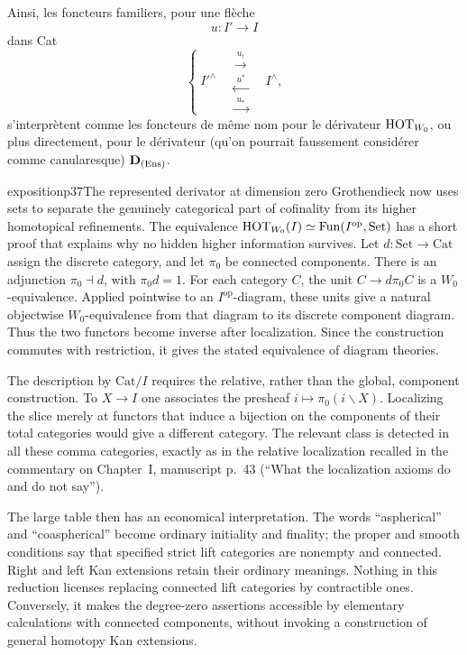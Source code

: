 Ainsi, les foncteurs familiers, pour une flèche
\[
u : I' \longrightarrow I
\]
dans Cat
\[
\left\{
\; I'^{\wedge} \quad
\begin{array}{c}
\xrightarrow{\;u_!\;} \\[1.5ex]
\xleftarrow{\;u^*\;} \\[1.5ex]
\xrightarrow{\;u_*\;}
\end{array}
\quad I^{\wedge},
\right. \tag*{(3.7)}
\]
s'interprètent comme les foncteurs de même nom pour le dérivateur $\mathrm{HOT}_{W_0}$, ou plus directement, pour le dérivateur (qu'on pourrait faussement considérer comme canularesque) $\mathbf{D}_{(\mathrm{Ens})}$.

\begin{dcomment}{exposition}{p37}{The represented derivator at dimension zero}
Grothendieck now uses sets to separate the genuinely categorical part of cofinality from its higher homotopical refinements. The equivalence $\mathrm{HOT}_{W_0}(I)\simeq\operatorname{Fun}(I^{\mathrm{op}},\mathrm{Set})$ has a short proof that explains why no hidden higher information survives. Let $d:\mathrm{Set}\longrightarrow\mathrm{Cat}$ assign the discrete category, and let $\pi_0$ be connected components. There is an adjunction $\pi_0\dashv d$, with $\pi_0d=1$. For each category $C$, the unit $C\longrightarrow d\pi_0C$ is a $W_0$-equivalence. Applied pointwise to an $I^{\mathrm{op}}$-diagram, these units give a natural objectwise $W_0$-equivalence from that diagram to its discrete component diagram. Thus the two functors become inverse after localization. Since the construction commutes with restriction, it gives the stated equivalence of diagram theories.

The description by $\mathrm{Cat}/I$ requires the relative, rather than the global, component construction. To $X\longrightarrow I$ one associates the presheaf $i\longmapsto\pi_0(i\backslash X)$. Localizing the slice merely at functors that induce a bijection on the components of their total categories would give a different category. The relevant class is detected in all these comma categories, exactly as in the relative localization recalled in the commentary on Chapter~I, manuscript p.~43 (``What the localization axioms do and do not say'').

The large table then has an economical interpretation. The words ``aspherical'' and ``coaspherical'' become ordinary initiality and finality; the proper and smooth conditions say that specified strict lift categories are nonempty and connected. Right and left Kan extensions retain their ordinary meanings. Nothing in this reduction licenses replacing connected lift categories by contractible ones. Conversely, it makes the degree-zero assertions accessible by elementary calculations with connected components, without invoking a construction of general homotopy Kan extensions.
\end{dcomment}


